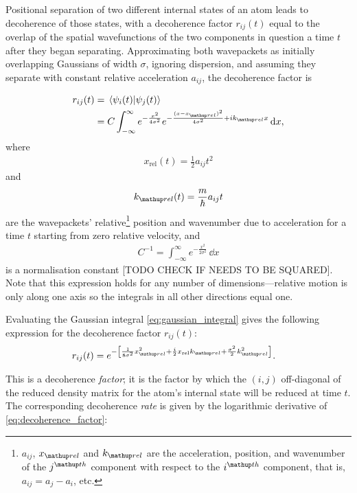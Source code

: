 Positional separation of two different internal states of an atom leads to decoherence of those states, with a decoherence factor $r_{ij}(t)$ equal to the overlap of the spatial wavefunctions of the two components in question a time $t$ after they began separating. Approximating both wavepackets as initially overlapping Gaussians of width $\sigma$, ignoring dispersion, and assuming they separate with constant relative acceleration $a_{ij}$, the decoherence factor is

\begin{align}
r_{ij}(t) &= \braket{\psi_i(t)}{\psi_j(t)}\\
 &= C \int_{-\infty}^{\infty} e^{-\frac{x^2}{4\sigma^2}}e^{-\frac{(x-x_\up{rel})^2}{4\sigma^2} + ik_\up{rel}x}\,\dd x,\label{eq:gaussian_integral}
\end{align}
where
\begin{align}
x_{\mathrm{rel}}(t) = \frac12a_{ij}t^2
\end{align}
and
\begin{align}
k_\up{rel}(t) = \frac m \hbar a_{ij} t
\end{align}
are the wavepackets' relative\footnote{$a_{ij}$, $x_\up{rel}$ and $k_\up{rel}$ are the acceleration, position, and wavenumber of the $j^\up{th}$ component with respect to the $i^\up{th}$ component, that is, $a_{ij} = a_j - a_i$, etc.} position and wavenumber due to acceleration for a time $t$ starting from zero relative velocity, and
\begin{align}
C^{-1}=\int_{-\infty}^\infty e^{-\frac{x^2}{2\sigma^2}}\,\dd x\label{supp:eq:Cdef}
\end{align}
is a normalisation constant [TODO CHECK IF NEEDS TO BE SQUARED]. Note that this expression holds for any number of dimensions---relative motion is only along one axis so the integrals in all other directions equal one.

Evaluating the Gaussian integral \eqref{eq:gaussian_integral} gives the following expression for the decoherence factor $r_{ij}(t)$:
\begin{align}
r_{ij}(t)&= e^{-\left[
        \frac{1} {8\sigma^2} x_\up{rel}^2
      + \frac i2 x_{\mathrm{rel}} k_\up{rel}
      + \frac{\sigma^2}{2} k_\up{rel}^2
      \right]}\label{eq:decoherence_factor}.
\end{align}

This is a decoherence \emph{factor}; it is the factor by which the $(i, j)$ off-diagonal of the reduced density matrix for the atom's internal state will be reduced at time $t$. The corresponding decoherence \emph{rate} is given by the logarithmic derivative of \eqref{eq:decoherence_factor}:

